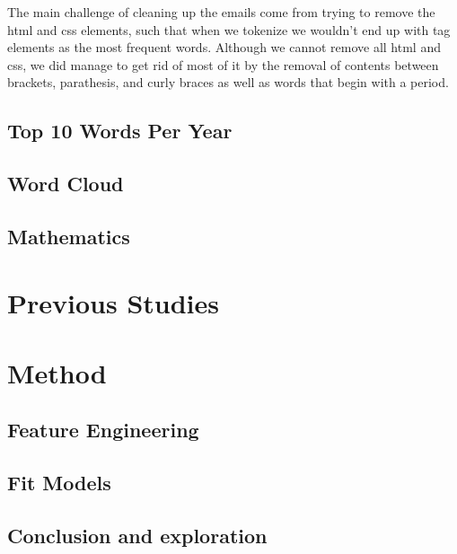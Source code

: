 \documentclass[12pt]{article}
\begin{document}
The main challenge of cleaning up the emails come from trying to remove the html and css elements, such that when we tokenize we wouldn't end up with tag elements as the most frequent words. Although we cannot remove all html and css, we did manage to get rid of most of it by the removal of contents between brackets, parathesis, and curly braces as well as words that begin with a period.  

%


\subsection{Top 10 Words Per Year}



\subsection{Word Cloud}

\subsection{Mathematics}

\section{Previous Studies}

\section{Method}

\subsection{Feature Engineering}

\subsection{Fit Models}

\subsection{Conclusion and exploration}
\end{document}

